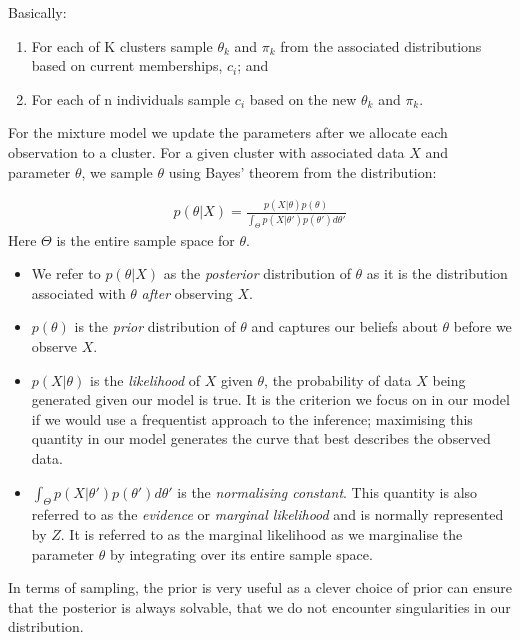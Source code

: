 \documentclass[12pt]{article} %
\begin{document}
	Basically:
	\begin{enumerate}
		\item For each of K clusters sample $\theta_k$ and $\pi_k$ from the associated distributions based on current memberships, $c_i$; and
		\item For each of n individuals sample $c_i$ based on the new $\theta_k$ and $\pi_k$.
	\end{enumerate}
	
	For the mixture model we update the parameters after we allocate each observation to a cluster. For a given cluster with associated data $X$ and parameter $\theta$, we sample $\theta$ using Bayes' theorem from the distribution:
	
	\begin{align} \label{Bayes_theorem}
	p(\theta | X) = \frac{p(X | \theta) p(\theta)}{\int_\Theta p(X | \theta ') p(\theta ') d \theta '}
	\end{align}
	Here $\Theta$ is the entire sample space for $\theta$. 
	\begin{itemize}
		\item We refer to $p(\theta | X)$ as the \emph{posterior} distribution of $\theta$ as it is the distribution associated with $\theta$ \emph{after} observing $X$.
		\item $p(\theta)$ is the \emph{prior} distribution of $\theta$ and captures our beliefs about $\theta$ before we observe $X$.
		\item $p(X | \theta)$ is the \emph{likelihood} of $X$ given $\theta$, the probability of data $X$ being generated given our model is true. It is the criterion we focus on in our model if we would use a frequentist approach to the inference; maximising this quantity in our model generates the curve that best describes the observed data. 
		\item $\int_\Theta p(X | \theta ') p(\theta ') d \theta '$ is the \emph{normalising constant}. This quantity is also referred to as the \emph{evidence} \cite{MacKayInformationTheoryInference2003} or \emph{marginal likelihood} and is normally represented by $Z$. It is referred to as the marginal likelihood as we marginalise the parameter $\theta$ by integrating over its entire sample space.
	\end{itemize}
	
	In terms of sampling, the prior is very useful as a clever choice of prior can ensure that the posterior is always solvable, that we do not encounter singularities in our distribution.
	
\end{document}
